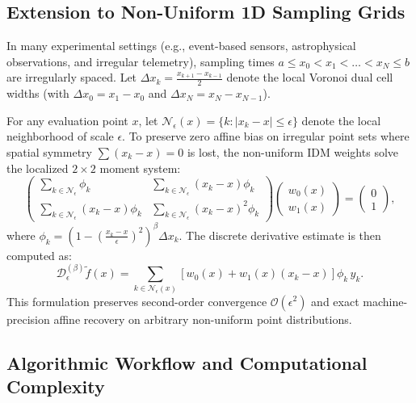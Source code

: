 \documentclass[11pt,a4paper]{article}
\theoremstyle{definition}
\begin{document}
\subsection{Extension to Non-Uniform 1D Sampling Grids}
\label{sec:nonuniform_grids}
In many experimental settings (e.g., event-based sensors, astrophysical observations, and irregular telemetry), sampling times $a \le x_0 < x_1 < \dots < x_N \le b$ are irregularly spaced. Let $\Delta x_k = \frac{x_{k+1} - x_{k-1}}{2}$ denote the local Voronoi dual cell widths (with $\Delta x_0 = x_1 - x_0$ and $\Delta x_N = x_N - x_{N-1}$).

For any evaluation point $x$, let $\mathcal{N}_\epsilon(x) = \{ k : |x_k - x| \le \epsilon \}$ denote the local neighborhood of scale $\epsilon$. To preserve zero affine bias on irregular point sets where spatial symmetry $\sum (x_k - x) = 0$ is lost, the non-uniform IDM weights solve the localized $2 \times 2$ moment system:
\begin{equation}
\begin{pmatrix} \sum_{k \in \mathcal{N}_\epsilon} \phi_k & \sum_{k \in \mathcal{N}_\epsilon} (x_k - x) \phi_k \\ \sum_{k \in \mathcal{N}_\epsilon} (x_k - x) \phi_k & \sum_{k \in \mathcal{N}_\epsilon} (x_k - x)^2 \phi_k \end{pmatrix} \begin{pmatrix} w_0(x) \\ w_1(x) \end{pmatrix} = \begin{pmatrix} 0 \\ 1 \end{pmatrix},
\end{equation}
where $\phi_k = \left( 1 - \left( \frac{x_k - x}{\epsilon} \right)^2 \right)^\beta \Delta x_k$. The discrete derivative estimate is then computed as:
\begin{equation}
\mathcal{D}_\epsilon^{(\beta)} \tilde{f}(x) = \sum_{k \in \mathcal{N}_\epsilon(x)} \left[ w_0(x) + w_1(x) (x_k - x) \right] \phi_k \, y_k.
\end{equation}
This formulation preserves second-order convergence $\mathcal{O}(\epsilon^2)$ and exact machine-precision affine recovery on arbitrary non-uniform point distributions.

\subsection{Algorithmic Workflow and Computational Complexity}
\end{document}
